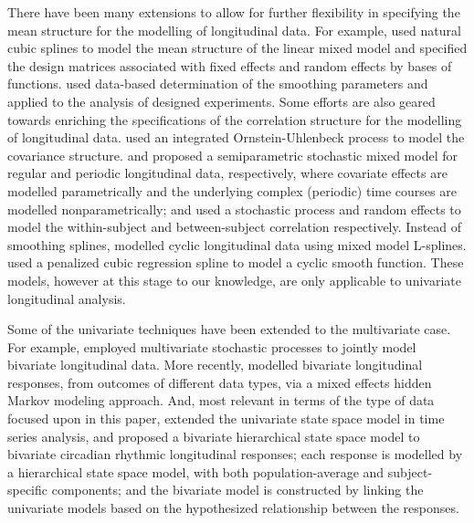 \documentclass[article,lineno]{biometrika}
\begin{document}
There have  been many extensions to allow for further flexibility in specifying the mean structure for  the modelling of  longitudinal data.  For example, 
\citet{Brumback:1998} used natural cubic splines to model the mean structure of the linear mixed model
and specified the design matrices associated with fixed effects and random effects by bases of functions.
\citet{Verb:Cull:Kenw:Welh:quan:1999} 
used data-based determination of the smoothing parameters and applied to the analysis of designed experiments. 
Some efforts are also geared towards enriching the specifications of the correlation structure for the modelling of longitudinal data.
\citet{Tayl:Cumb:Sy:quan:1994} used an integrated Ornstein-Uhlenbeck process to model the covariance structure.
 \cite {Zhang:1998} and \citet{Zhan:Lin:Sowe:quan:2000}  proposed a  semiparametric stochastic mixed model for regular and periodic longitudinal data, respectively, where   covariate effects are modelled parametrically and the underlying complex (periodic) time courses are modelled nonparametrically; and used a stochastic process and random effects to model the within-subject and between-subject correlation respectively. 
Instead of  smoothing splines, \cite{Welh:Cull:Kenw:Thom:quan:2006} modelled cyclic longitudinal data using mixed model L-splines. 
\citet{Wood:2006} used a penalized cubic regression spline to model a cyclic smooth function. 
These models, however at this stage to our knowledge, are only applicable to univariate longitudinal analysis.


Some of the univariate techniques have been extended to the multivariate case.
For example, 
\citet{Sy:Cumb:Tayl:quan:1997} employed multivariate stochastic processes to jointly model  bivariate longitudinal data. 
 More recently, \cite{Raffa:2015} modelled bivariate longitudinal responses, from outcomes of different data types, via a mixed effects hidden Markov modeling approach.  And, most relevant in terms of the type of data focused upon in this paper,  \cite{Liu:Capp:Crof:Guo:quan:2014} extended the univariate state space model in time series analysis, and proposed a bivariate hierarchical state space model to bivariate circadian rhythmic  longitudinal responses;
each response is modelled by a hierarchical state space model, with both population-average and subject-specific components; and the bivariate model is constructed by linking the univariate models based on the hypothesized relationship between the responses. 
\end{document}
